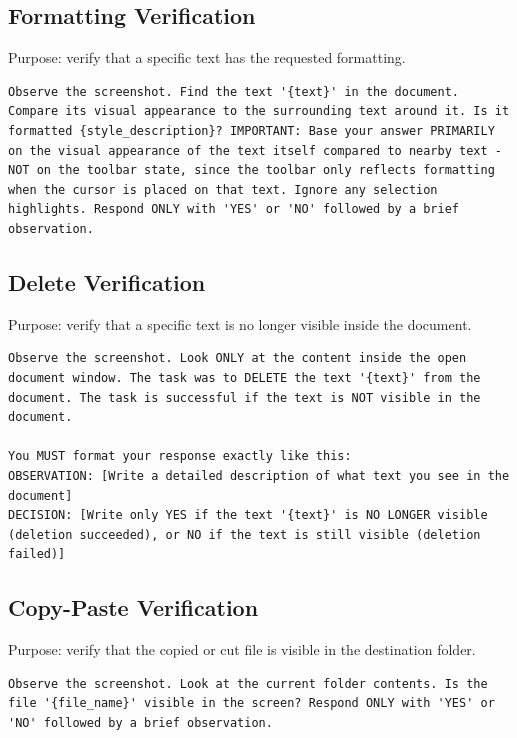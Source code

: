 \subsection{Formatting Verification}

Purpose: verify that a specific text has the requested formatting.

\begin{lstlisting}
Observe the screenshot. Find the text '{text}' in the document. Compare its visual appearance to the surrounding text around it. Is it formatted {style_description}? IMPORTANT: Base your answer PRIMARILY on the visual appearance of the text itself compared to nearby text - NOT on the toolbar state, since the toolbar only reflects formatting when the cursor is placed on that text. Ignore any selection highlights. Respond ONLY with 'YES' or 'NO' followed by a brief observation.
\end{lstlisting}

\subsection{Delete Verification}

Purpose: verify that a specific text is no longer visible inside the document.

\begin{lstlisting}
Observe the screenshot. Look ONLY at the content inside the open document window. The task was to DELETE the text '{text}' from the document. The task is successful if the text is NOT visible in the document.

You MUST format your response exactly like this:
OBSERVATION: [Write a detailed description of what text you see in the document]
DECISION: [Write only YES if the text '{text}' is NO LONGER visible (deletion succeeded), or NO if the text is still visible (deletion failed)]
\end{lstlisting}

\subsection{Copy-Paste Verification}

Purpose: verify that the copied or cut file is visible in the destination folder.

\begin{lstlisting}
Observe the screenshot. Look at the current folder contents. Is the file '{file_name}' visible in the screen? Respond ONLY with 'YES' or 'NO' followed by a brief observation.
\end{lstlisting}

